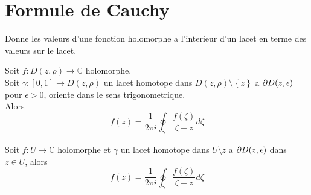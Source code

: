 \documentclass[../main.tex]{subfiles}
\begin{document}
\section{Formule de Cauchy}
Donne les valeurs d'une fonction holomorphe a l'interieur d'un lacet en terme des valeurs sur le lacet.
\begin{thm}
	Soit $f: D( z,\rho) \to \mathbb{C}$ holomorphe.\\
	Soit $\gamma: [ 0,1] \to D( z,\rho) $ un lacet homotope dans $D( z,\rho) \setminus \left\{ z \right\} $ a $\partial D( z,\epsilon) $ pour $\epsilon>0$, oriente dans le sens trigonometrique.\\
	Alors
	\[ 
		f( z) = \frac{1}{2\pi i}\oint_\gamma \frac{f( \zeta) }{\zeta-z}d\zeta
	\]
	
\end{thm}
\begin{crly}
	Soit $f:U\to \mathbb{C}$ holomorphe et $\gamma$ un lacet homotope dans $U\setminus z$ a $\partial D( z,\epsilon) $ dans $z\in U$, alors
	\[ 
		f( z) = \frac{1}{2\pi i}\oint_\gamma \frac{f( \zeta) }{\zeta-z}d\zeta
	\]
\end{crly}
\end{document}
